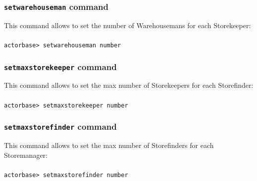 \documentclass[a4paper]{article}
\begin{document}
	\subsubsection{\texttt{setwarehouseman} command}
	This command allows to set the number of Warehousemans for each Storekeeper:
	\\ \\
	\texttt{actorbase>	setwarehouseman number}
	
	\subsubsection{\texttt{setmaxstorekeeper} command}
	This command allows to set the max number of Storekeepers for each Storefinder:
	\\ \\
	\texttt{actorbase>	setmaxstorekeeper number}

	\subsubsection{\texttt{setmaxstorefinder} command}
	This command allows to set the max number of Storefinders for each Storemanager:
	\\ \\
	\texttt{actorbase>	setmaxstorefinder number}
	
	\cleardoublepage
	\listoffigures
	
	\cleardoublepage
	\listoftables
		
\end{document}
